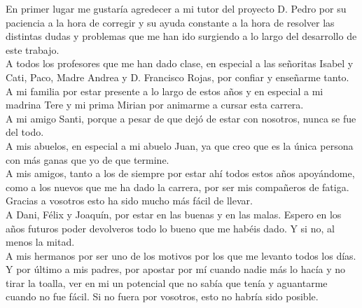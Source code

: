 En primer lugar me gustaría agredecer a mi tutor del proyecto D. Pedro por su paciencia a la hora de corregir y su ayuda constante a la hora de resolver las distintas dudas y problemas que me han ido surgiendo a lo largo del desarrollo de este trabajo.\\
A todos los profesores que me han dado clase, en especial a las señoritas Isabel y Cati, Paco, Madre Andrea y D. Francisco Rojas, por confiar y enseñarme tanto.\\
A mi familia por estar presente a lo largo de estos años y en especial a mi madrina Tere y mi prima Mirian por animarme a cursar esta carrera.\\
A mi amigo Santi, porque a pesar de que dejó de estar con nosotros, nunca se fue del todo.\\
A mis abuelos, en especial a mi abuelo Juan, ya que creo que es la única persona con más ganas que yo de que termine.\\
A mis amigos, tanto a los de siempre por estar ahí todos estos años apoyándome, como  a los nuevos que me ha dado la carrera, por ser mis compañeros de fatiga. Gracias a vosotros esto ha sido mucho más fácil de llevar.\\
A Dani, Félix y Joaquín, por estar en las buenas y en las malas. Espero en los años futuros poder devolveros todo lo bueno que me habéis dado. Y si no, al menos la mitad.\\
A mis hermanos por ser uno de los motivos por los que me levanto todos los días.\\
Y por último a mis padres, por apostar por mí cuando nadie más lo hacía y no tirar la toalla, ver en mi un potencial que no sabía que tenía y aguantarme cuando no fue fácil. Si no fuera por vosotros, esto no habría sido posible.

